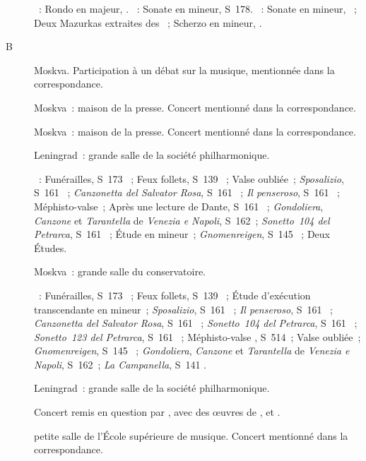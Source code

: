 \begin{description}
 \textsc{\Beethoven{}}~: Rondo en \kG majeur,  .
 \textsc{\Liszt{}}~: Sonate en \kB mineur, S~178.
 \textsc{\Chopin{}}~: Sonate en \kB \Flat mineur, ~; Deux Mazurkas
 extraites des ~; Scherzo en \kB \Flat mineur, .
 \item[B\DateWithWeekDay{1932-04-02}]
 Moskva.
 Participation à un débat sur la musique, mentionnée dans la correspondance.
 \item[\DateWithWeekDay{1932-04-06}]
 Moskva~: maison de la presse.
 Concert mentionné dans la correspondance.
 \item[\DateWithWeekDay{1932-04-12}]
 Moskva~: maison de la presse.
 Concert mentionné dans la correspondance.
 \item[\DateWithWeekDay{1932-04-19}]
 Leningrad~: grande salle de la société philharmonique.

 \textsc{\Liszt{}}~: Funérailles, S~173 ~; Feux follets, S~139
 ~; Valse oubliée~; \emph{Sposalizio}, S~161 ~;
 \emph{Canzonetta del Salvator Rosa}, S~161 ~; \emph{Il
 penseroso}, S~161 ~; Méphisto-valse~; Après une lecture de Dante,
 S~161 ~; \emph{Gondoliera}, \emph{Canzone} et \emph{Tarantella}
 de \emph{Venezia e Napoli}, S~162~; \emph{Sonetto~104 del Petrarca}, S~161
 ~; Étude en \kF mineur~; \emph{Gnomenreigen}, S~145 ~;
 Deux Études.
 \item[\DateWithWeekDay{1932-04-20}]
 Moskva~: grande salle du conservatoire.

 \textsc{\Liszt{}}~: Funérailles, S~173 ~; Feux follets, S~139
 ~; Étude d'exécution transcendante  en \kF mineur~;
 \emph{Sposalizio}, S~161 ~; \emph{Il penseroso}, S~161
 ~; \emph{Canzonetta del Salvator Rosa}, S~161 ~;
 \emph{Sonetto~104 del Petrarca}, S~161 ~; \emph{Sonetto~123 del
 Petrarca}, S~161 ~; Méphisto-valse , S~514~; Valse
 oubliée~; \emph{Gnomenreigen}, S~145 ~; \emph{Gondoliera},
 \emph{Canzone} et \emph{Tarantella} de \emph{Venezia e Napoli}, S~162~;
 \emph{La Campanella}, S~141 .
 \item[\DateWithWeekDay{1932-04-25}]
 Leningrad~: grande salle de la société philharmonique.

 Concert remis en question par \Vizel{}, avec des œuvres de \Schumann{},
 \Brahms{} et \Chopin{}.
 \item[\DateWithWeekDay{1932-05-12}]
 petite salle de l'\hbox{École} supérieure de musique.
 Concert mentionné dans la correspondance.


\end{description}
